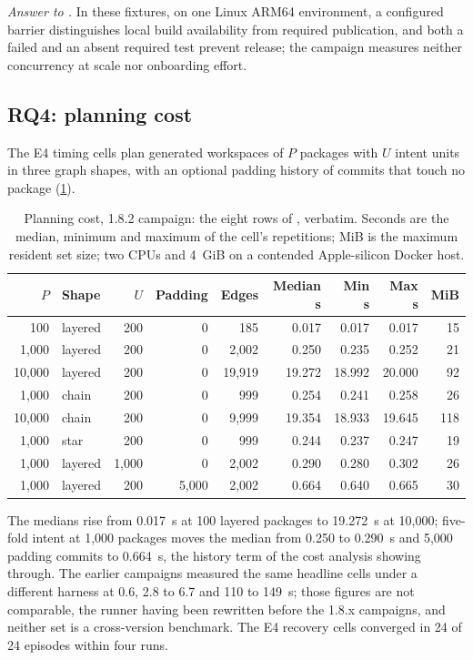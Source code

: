 \emph{Answer to .} In these fixtures, on one Linux ARM64 environment,
a configured barrier distinguishes local build availability from required
publication, and both a failed and an absent required test prevent release;
the campaign measures neither concurrency at scale nor onboarding effort.

\subsection{RQ4: planning cost}
\label{sec:eval:rq4}

The E4 timing cells plan generated workspaces of $P$ packages with $U$ intent
units in three graph shapes, with an optional padding history of commits that
touch no package (\cref{tab:eval:rq4}).

\begin{table}[ht]
\centering\footnotesize
\caption{Planning cost, 1.8.2 campaign: the eight rows of
\protect{}, verbatim.
Seconds are the median, minimum and maximum of the cell's repetitions; MiB is
the maximum resident set size; two CPUs and 4~GiB on a contended
Apple-silicon Docker host.}
\label{tab:eval:rq4}
\begin{tabular}{@{}rlrrrrrrr@{}}
\toprule
$P$ & Shape & $U$ & Padding & Edges & Median s & Min s & Max s & MiB \\
\midrule
100 & layered & 200 & 0 & 185 & 0.017 & 0.017 & 0.017 & 15 \\
1,000 & layered & 200 & 0 & 2,002 & 0.250 & 0.235 & 0.252 & 21 \\
10,000 & layered & 200 & 0 & 19,919 & 19.272 & 18.992 & 20.000 & 92 \\
1,000 & chain & 200 & 0 & 999 & 0.254 & 0.241 & 0.258 & 26 \\
10,000 & chain & 200 & 0 & 9,999 & 19.354 & 18.933 & 19.645 & 118 \\
1,000 & star & 200 & 0 & 999 & 0.244 & 0.237 & 0.247 & 19 \\
1,000 & layered & 1,000 & 0 & 2,002 & 0.290 & 0.280 & 0.302 & 26 \\
1,000 & layered & 200 & 5,000 & 2,002 & 0.664 & 0.640 & 0.665 & 30 \\
\bottomrule
\end{tabular}
\end{table}

The medians rise from 0.017~s at 100 layered packages to 19.272~s at 10,000;
five-fold intent at 1,000 packages moves the median from 0.250 to 0.290~s and
5,000 padding commits to 0.664~s, the history term of the cost analysis
showing through. The earlier campaigns measured the same headline cells under
a different harness at 0.6, 2.8 to 6.7 and 110 to 149~s; those figures are not
comparable, the runner having been rewritten before the 1.8.x campaigns, and
neither set is a cross-version benchmark. The E4 recovery cells converged in
24 of 24 episodes within four runs.

